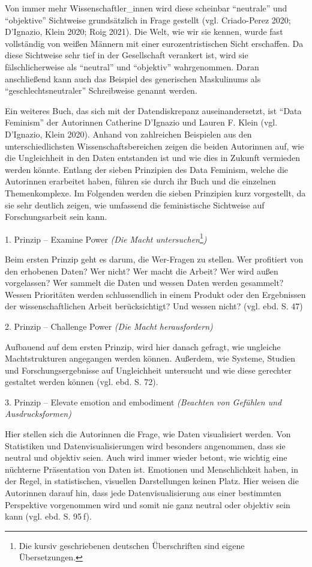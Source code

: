 \documentclass[a4paper,
fontsize=11pt,
oneside,
numbers=noperiodatend,
parskip=half-,
bibliography=totoc,
final
]{scrartcl}
\begin{document}
Von immer mehr Wissenschaftler\_innen wird diese scheinbar
\enquote{neutrale} und \enquote{objektive} Sichtweise grundsätzlich in
Frage gestellt (vgl. Criado-Perez 2020; D'Ignazio, Klein 2020; Roig
2021). Die Welt, wie wir sie kennen, wurde fast vollständig von weißen
Männern mit einer eurozentristischen Sicht erschaffen. Da diese
Sichtweise sehr tief in der Gesellschaft verankert ist, wird sie
fälschlicherweise als \enquote{neutral} und \enquote{objektiv}
wahrgenommen. Daran anschließend kann auch das Beispiel des generischen
Maskulinums als \enquote{geschlechtsneutraler} Schreibweise genannt
werden.

Ein weiteres Buch, das sich mit der Datendiskrepanz auseinandersetzt,
ist \enquote{Data Feminism} der Autorinnen Catherine D'Ignazio und
Lauren F. Klein (vgl. D'Ignazio, Klein 2020). Anhand von zahlreichen
Beispielen aus den unterschiedlichsten Wissenschaftsbereichen zeigen die
beiden Autorinnen auf, wie die Ungleichheit in den Daten entstanden ist
und wie dies in Zukunft vermieden werden könnte. Entlang der sieben
Prinzipien des Data Feminism, welche die Autorinnen erarbeitet haben,
führen sie durch ihr Buch und die einzelnen Themenkomplexe. Im Folgenden
werden die sieben Prinzipien kurz vorgestellt, da sie sehr deutlich
zeigen, wie umfassend die feministische Sichtweise auf Forschungsarbeit
sein kann.

1. Prinzip -- Examine Power \emph{(Die Macht
untersuchen}\footnote{Die kursiv geschriebenen deutschen Überschriften
  sind eigene Übersetzungen.}\emph{)}

Beim ersten Prinzip geht es darum, die Wer-Fragen zu stellen. Wer
profitiert von den erhobenen Daten? Wer nicht? Wer macht die Arbeit? Wer
wird außen vorgelassen? Wer sammelt die Daten und wessen Daten werden
gesammelt? Wessen Prioritäten werden schlussendlich in einem Produkt
oder den Ergebnissen der wissenschaftlichen Arbeit berücksichtigt? Und
wessen nicht? (vgl. ebd. S. 47)

2. Prinzip -- Challenge Power \emph{(Die Macht herausfordern)}

Aufbauend auf dem ersten Prinzip, wird hier danach gefragt, wie
ungleiche Machtstrukturen angegangen werden können. Außerdem, wie
Systeme, Studien und Forschungsergebnisse auf Ungleichheit untersucht
und wie diese gerechter gestaltet werden können (vgl. ebd. S. 72).

3. Prinzip -- Elevate emotion and embodiment \emph{(Beachten von
Gefühlen und Ausdrucksformen)}

Hier stellen sich die Autorinnen die Frage, wie Daten visualisiert
werden. Von Statistiken und Datenvisualisierungen wird besonders
angenommen, dass sie neutral und objektiv seien. Auch wird immer wieder
betont, wie wichtig eine nüchterne Präsentation von Daten ist. Emotionen
und Menschlichkeit haben, in der Regel, in statistischen, visuellen
Darstellungen keinen Platz. Hier weisen die Autorinnen darauf hin, dass
jede Datenvisualisierung aus einer bestimmten Perspektive vorgenommen
wird und somit nie ganz neutral oder objektiv sein kann (vgl. ebd. S.
95 f).
\end{document}
